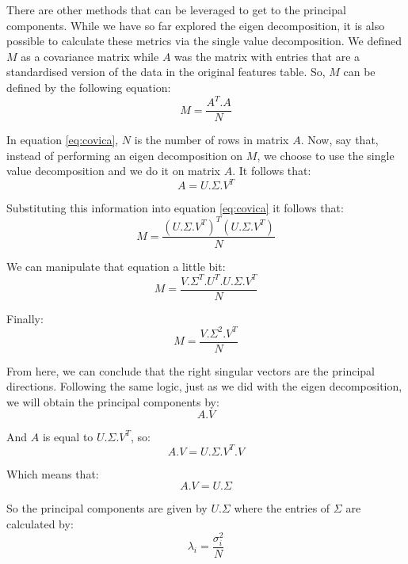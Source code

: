 \documentclass[a4,12pt,twosided,openany]{memoir}
\begin{document}
There are other methods that can be leveraged to get to the principal components. While we have so far explored the eigen decomposition, it is also possible to calculate these metrics via the single value decomposition. We defined $M$ as a covariance matrix while $A$ was the matrix with entries that are a standardised version of the data in the original features table. So, $M$ can be defined by the following equation:
\begin{equation}\label{eq:covica}
M = \frac{A^T.A}{N}
\end{equation}
\par 
\indent
In equation \ref{eq:covica}, $N$ is the number of rows in matrix $A$. Now, say that, instead of performing an eigen decomposition on $M$, we choose to use the single value decomposition and we do it on matrix $A$. It follows that:
\[A = U.\Sigma.V^T\]
\par 
\indent
Substituting this information into equation \ref{eq:covica}  it follows that:
\[M = \frac{(U.\Sigma.V^T)^T(U.\Sigma.V^T)}{N}\]
\par 
\indent
We can manipulate that equation a little bit:
\[M = \frac{V.\Sigma^T.U^T.U.\Sigma.V^T}{N}\]
\par 
\indent
Finally:
\begin{equation}
M = \frac{V.\Sigma^2.V^T}{N}
\end{equation}
\par 
\indent
From here, we can conclude that the right singular vectors are the principal directions. Following the same logic, just as we did with the eigen decomposition, we will obtain the principal components by:
\[ A.V \]
\par 
\indent
And $A$ is equal to $U.\Sigma.V^T$, so:
\[A.V = U.\Sigma.V^T.V\]
\par 
\indent
Which means that:
\[A.V = U.\Sigma \]
\par 
\indent
So the principal components are given by $U.\Sigma$ where the entries of $\Sigma$ are calculated by: 
\[ \lambda_i = \frac{\sigma_i^2}{N}\]
\end{document}
